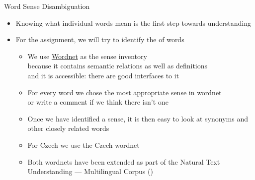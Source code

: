 \begin{frame}{Word Sense Disambiguation}

\begin{itemize}
\item Knowing what individual words mean is the first step towards understanding
\item For the assignment, we will try to identify the  of words
  \begin{itemize}
  \item We use \href{https://wordnet.princeton.edu/}{Wordnet} \citep{_Fellbaum:1998} as the sense inventory
    \\ because it contains semantic relations as well as definitions
    \\ and it is accessible: there are good interfaces to it
  \item For every word we chose the most appropriate sense in wordnet
    \\ or write a comment if we think there isn't one
  \item Once we have identified a sense, it is then easy to look at
    synonyms and other closely related words
  \item For Czech we use the Czech wordnet \citep{Pala:Smrz:2004}
  \item Both wordnets have been extended as part of the Natural Text Understanding --- Multilingual Corpus ()
  \end{itemize}
\end{itemize}
\end{frame}


  


